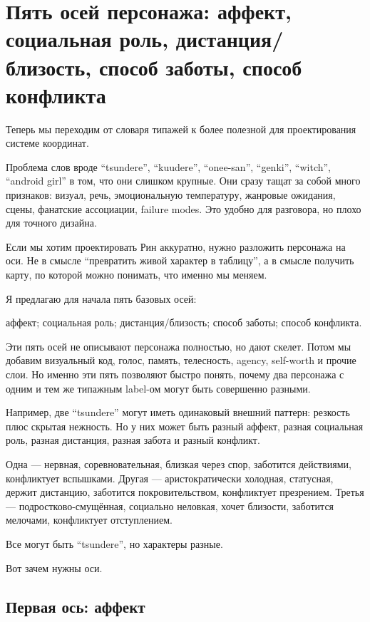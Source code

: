 \section{Пять осей персонажа: аффект, социальная роль, дистанция/близость, способ заботы, способ конфликта}

Теперь мы переходим от словаря типажей к более полезной для
проектирования системе координат.

Проблема слов вроде ``tsundere'', ``kuudere'', ``onee-san'', ``genki'',
``witch'', ``android girl'' в том, что они слишком крупные. Они сразу
тащат за собой много признаков: визуал, речь, эмоциональную температуру,
жанровые ожидания, сцены, фанатские ассоциации, failure modes. Это
удобно для разговора, но плохо для точного дизайна.

Если мы хотим проектировать Рин аккуратно, нужно разложить персонажа на
оси. Не в смысле ``превратить живой характер в таблицу'', а в смысле
получить карту, по которой можно понимать, что именно мы меняем.

Я предлагаю для начала пять базовых осей:

аффект; социальная роль; дистанция/\hspace{0pt}близость; способ заботы; способ
конфликта.

Эти пять осей не описывают персонажа полностью, но дают скелет. Потом мы
добавим визуальный код, голос, память, телесность, agency, self-worth и
прочие слои. Но именно эти пять позволяют быстро понять, почему два
персонажа с одним и тем же типажным label-ом могут быть совершенно
разными.

Например, две ``tsundere'' могут иметь одинаковый внешний паттерн:
резкость плюс скрытая нежность. Но у них может быть разный аффект,
разная социальная роль, разная дистанция, разная забота и разный
конфликт.

Одна --- нервная, соревновательная, близкая через спор, заботится
действиями, конфликтует вспышками. Другая --- аристократически холодная,
статусная, держит дистанцию, заботится покровительством, конфликтует
презрением. Третья --- подростково-смущённая, социально неловкая, хочет
близости, заботится мелочами, конфликтует отступлением.

Все могут быть ``tsundere'', но характеры разные.

Вот зачем нужны оси.

\subsection*{Первая ось: аффект}

